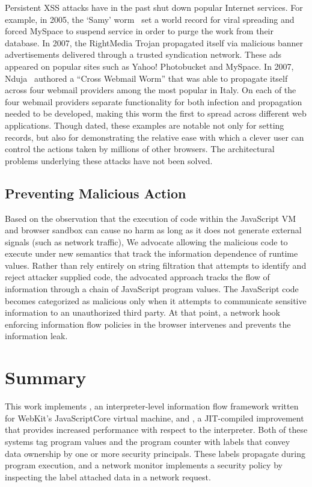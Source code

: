 Persistent XSS attacks have in the past shut down popular Internet services.
For example, in 2005, the `Samy' worm~\cite{samy} set a world record for viral spreading and forced MySpace to suspend service in order to purge the work from their database.
In 2007, the RightMedia Trojan propagated itself via malicious banner advertisements delivered through a trusted syndication network.
These ads appeared on popular sites such as Yahoo! Photobucket and MySpace.
In 2007, Nduja~\cite{nduja} authored a ``Cross Webmail Worm'' that was able to propagate itself across four webmail providers among the most popular in Italy.
On each of the four webmail providers separate functionality for both infection and propagation needed to be developed, making this worm the first to spread across different web applications.
Though dated, these examples are notable not only for setting records, but also for demonstrating the relative ease with which a clever user can control the actions taken by millions of other browsers.
The architectural problems underlying these attacks have not been solved.

\subsection{Preventing Malicious Action}

Based on the observation that the execution of code within the JavaScript VM and browser sandbox can cause no harm as long as it does not generate external signals (such as network traffic), We advocate allowing the malicious code to execute under new semantics that track the information dependence of runtime values.
Rather than rely entirely on string filtration that attempts to identify and reject attacker supplied code, the advocated approach tracks the flow of information through a chain of JavaScript program values.
The JavaScript code becomes categorized as malicious only when it attempts to communicate sensitive information to an unauthorized third party.
At that point, a network hook enforcing information flow policies in the browser intervenes and prevents the information leak.

\section{Summary}

This work implements \FlowCore, an interpreter-level information flow framework written for WebKit's JavaScriptCore virtual machine, and \JitFlow, a JIT-compiled improvement that provides increased performance with respect to the interpreter.
Both of these systems tag program values and the program counter with labels that convey data ownership by one or more security principals.
These labels propagate during program execution, and a network monitor implements a security policy by inspecting the label attached data in a network request.


